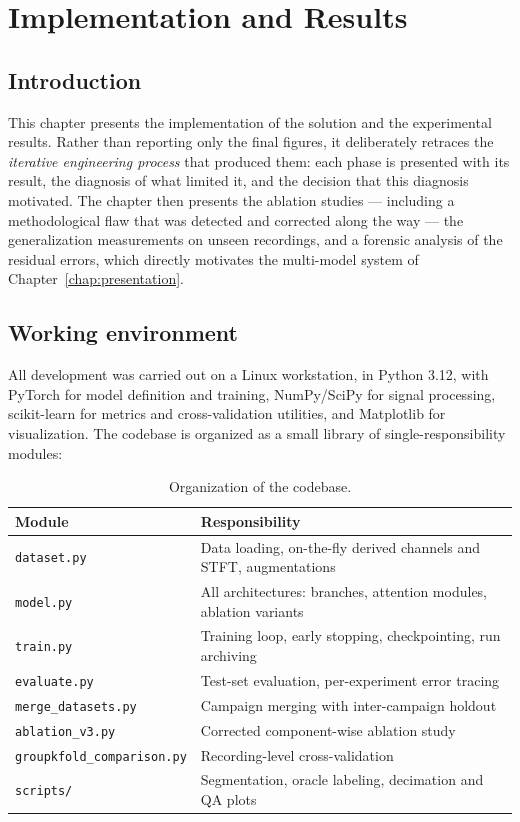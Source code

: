 \chapter{Implementation and Results}
\label{chap:results}

\section*{Introduction}

This chapter presents the implementation of the solution and the experimental results. Rather than reporting only the final figures, it deliberately retraces the \emph{iterative engineering process} that produced them: each phase is presented with its result, the diagnosis of what limited it, and the decision that this diagnosis motivated. The chapter then presents the ablation studies --- including a methodological flaw that was detected and corrected along the way --- the generalization measurements on unseen recordings, and a forensic analysis of the residual errors, which directly motivates the multi-model system of Chapter~\ref{chap:presentation}.

\section{Working environment}

All development was carried out on a Linux workstation, in Python 3.12, with PyTorch for model definition and training, NumPy/SciPy for signal processing, scikit-learn for metrics and cross-validation utilities, and Matplotlib for visualization. The codebase is organized as a small library of single-responsibility modules:

\begin{table}[H]
\centering
\caption{Organization of the codebase.}
\label{tab:codebase}
\renewcommand{\arraystretch}{1.3}
\small
\begin{tabular}{|l|p{9.6cm}|}
\hline
\textbf{Module} & \textbf{Responsibility} \\
\hline
\texttt{dataset.py} & Data loading, on-the-fly derived channels and STFT, augmentations \\
\hline
\texttt{model.py} & All architectures: branches, attention modules, ablation variants \\
\hline
\texttt{train.py} & Training loop, early stopping, checkpointing, run archiving \\
\hline
\texttt{evaluate.py} & Test-set evaluation, per-experiment error tracing \\
\hline
\texttt{merge\_datasets.py} & Campaign merging with inter-campaign holdout \\
\hline
\texttt{ablation\_v3.py} & Corrected component-wise ablation study \\
\hline
\texttt{groupkfold\_comparison.py} & Recording-level cross-validation \\
\hline
\texttt{scripts/} & Segmentation, oracle labeling, decimation and QA plots \\
\hline
\end{tabular}
\end{table}

